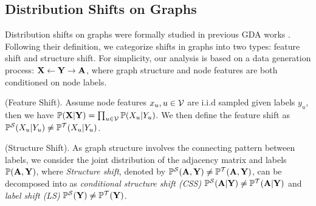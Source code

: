 \subsection{Distribution Shifts on Graphs} 
\label{sec:shift}
Distribution shifts on graphs were formally studied in previous GDA works \cite{wu2020unsupervised, liao2021information, zhu2021shift, wu2022handling, you2023graph, zhu2023explaining}.  
Following their definition, we categorize shifts in graphs into two types: feature shift and structure shift. For simplicity, our analysis is based on a data generation process: ${\mathbf{X}} \leftarrow {\mathbf{Y}} \rightarrow {\mathbf{A}}$,  
where graph structure and node features are both conditioned on node labels.

\begin{definition}
\label{def:attrshift}
(Feature Shift). Assume node features $x_u, u \in {\mathcal{V}}$ are i.i.d sampled given labels $y_u$, then we have $\mathbb{P}({\mathbf{X}}|{\mathbf{Y}})=\prod_{u\in{\mathcal{V}}}\mathbb{P}(X_u|Y_u)$. We then define the feature shift as $\mathbb{P}^\mathcal{S}(X_u|Y_u)\neq \mathbb{P}^\mathcal{T}(X_u|Y_u)$.
\end{definition}


\begin{definition}
\label{def:strucshift}
(Structure Shift). As graph structure involves the connecting pattern between labels, we consider the joint distribution of the adjacency matrix and labels $\mathbb{P}({\mathbf{A}},{\mathbf{Y}})$, where \emph{Structure shift}, denoted by $\mathbb{P}^\mathcal{S}({\mathbf{A}},{\mathbf{Y}}) \neq \mathbb{P}^\mathcal{T}({\mathbf{A}},{\mathbf{Y}})$,  can be decomposed into as \emph{conditional structure shift (CSS)} $\mathbb{P}^\mathcal{S}({\mathbf{A}}|{\mathbf{Y}}) \neq \mathbb{P}^\mathcal{T}({\mathbf{A}}|{\mathbf{Y}})$ and \emph{label shift (LS)} $\mathbb{P}^\mathcal{S}({\mathbf{Y}}) \neq \mathbb{P}^\mathcal{T}({\mathbf{Y}})$. 

\end{definition}



